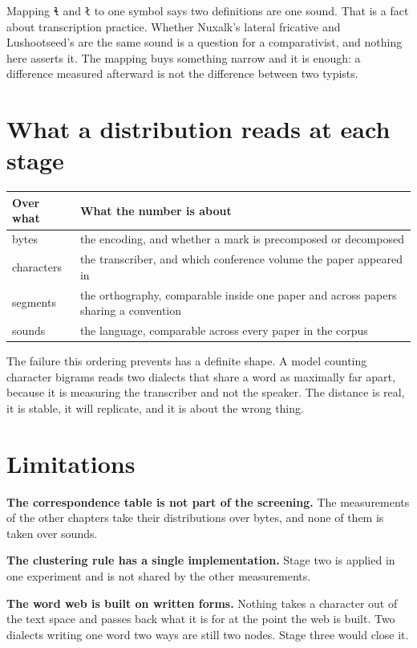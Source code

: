 Mapping \texttt{ɬ} and \texttt{ł} to one symbol says two definitions are one sound. That is a fact
about transcription practice. Whether Nuxalk's lateral fricative and Lushootseed's are the same
sound is a question for a comparativist, and nothing here asserts it. The mapping buys something
narrow and it is enough: a difference measured afterward is not the difference between two typists.

\section{What a distribution reads at each stage}

\tiny
\setlength{\tabcolsep}{2pt}
\begin{longtable}{@{}>{\arraybackslash}p{}>{\arraybackslash}p{}@{}}
\toprule
Over what & What the number is about \\
\midrule
bytes & the encoding, and whether a mark is precomposed or decomposed \\
characters & the transcriber, and which conference volume the paper appeared in \\
segments & the orthography, comparable inside one paper and across papers sharing a convention \\
sounds & the language, comparable across every paper in the corpus \\
\bottomrule
\end{longtable}
\normalsize

The failure this ordering prevents has a definite shape. A model counting character bigrams reads
two dialects that share a word as maximally far apart, because it is measuring the transcriber and
not the speaker. The distance is real, it is stable, it will replicate, and it is about the wrong
thing.

\section{Limitations}

\textbf{The correspondence table is not part of the screening.} The measurements of the other
chapters take their distributions over bytes, and none of them is taken over sounds.

\textbf{The clustering rule has a single implementation.} Stage two is applied in one experiment and
is not shared by the other measurements.

\textbf{The word web is built on written forms.} Nothing takes a character out of the text space and
passes back what it is for at the point the web is built. Two dialects writing one word two ways
are still two nodes. Stage three would close it.
